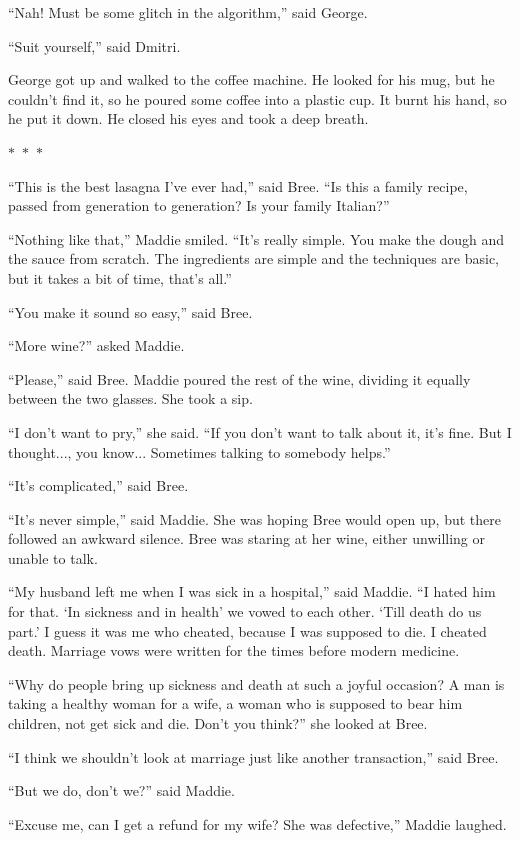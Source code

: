 \documentclass{memoir}
\newcommand{\starbreak}{%
\begin{center}
  $\ast$~$\ast$~$\ast$
\end{center}
}
\begin{document}
``Nah! Must be some glitch in the algorithm,'' said George.

``Suit yourself,'' said Dmitri.

George got up and walked to the coffee machine. He looked for his mug, but he couldn't find it, so he poured some coffee into a plastic cup. It burnt his hand, so he put it down. He closed his eyes and took a deep breath.

\starbreak

``This is the best lasagna I've ever had,'' said Bree. ``Is this a family recipe, passed from generation to generation? Is your family Italian?''

``Nothing like that,'' Maddie smiled. ``It's really simple. You make the dough and the sauce from scratch. The ingredients are simple and the techniques are basic, but it takes a bit of time, that's all.''

``You make it sound so easy,'' said Bree.

``More wine?'' asked Maddie.

``Please,'' said Bree. Maddie poured the rest of the wine, dividing it equally between the two glasses. She took a sip.

``I don't want to pry,'' she said. ``If you don't want to talk about it, it's fine. But I thought..., you know... Sometimes talking to somebody helps.''

``It's complicated,'' said Bree.

``It's never simple,'' said Maddie. She was hoping Bree would open up, but there followed an awkward silence. Bree was staring at her wine, either unwilling or unable to talk. 

``My husband left me when I was sick in a hospital,'' said Maddie. ``I hated him for that. `In sickness and in health' we vowed to each other. `Till death do us part.' I guess it was me who cheated, because I was supposed to die. I cheated death. Marriage vows were written for the times before modern medicine. 

``Why do people bring up sickness and death at such a joyful occasion? A man is taking a healthy woman for a wife, a woman who is supposed to bear him children, not get sick and die. Don't you think?'' she looked at Bree.

``I think we shouldn't look at marriage just like another transaction,'' said Bree.

``But we do, don't we?'' said Maddie. 

``Excuse me, can I get a refund for my wife? She was defective,'' Maddie laughed. 
\end{document}

